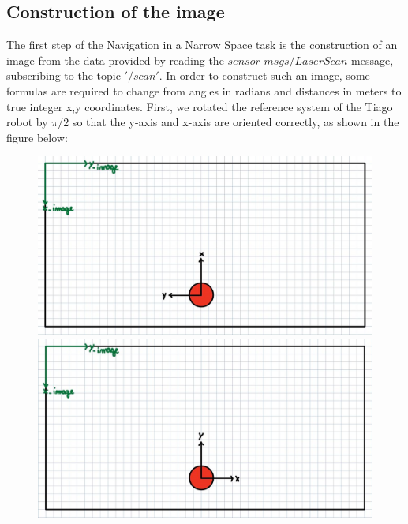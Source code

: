 \subsection{Construction of the image}
The first step of the Navigation in a Narrow Space task is the construction of an image from the data provided by reading the \(sensor\_msgs/LaserScan\) message, subscribing to the topic \('/scan'\). In order to construct such an image, some formulas are required to change from angles in radians and distances in meters to true integer x,y coordinates.
First, we rotated the reference system of the Tiago robot by \(\pi/2\) so that the y-axis and x-axis are oriented correctly, as shown in the figure below:
\begin{center}
    \begin{figure}[H]
        \begin{minipage}{0.5\textwidth}
        \centering
        \includegraphics[scale=0.20]{images/narrowSpace/old.png}
    \end{minipage}
    \begin{minipage}{0.5\textwidth}
        \centering
        \includegraphics[scale=0.20]{images/narrowSpace/new.png}
    \end{minipage}
    \end{figure}            
\end{center}
